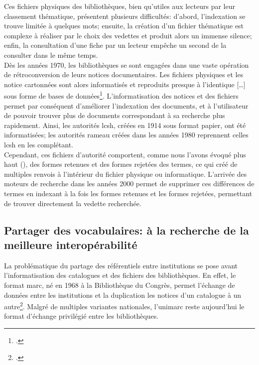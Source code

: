 Ces fichiers physiques des bibliothèques, bien qu'utiles aux lecteurs par leur classement thématique, présentent plusieurs difficultés: d'abord, l'indexation se trouve limitée à quelques mots; ensuite, la création d'un fichier thématique est complexe à réaliser par le choix des vedettes et produit alors un immense silence; enfin, la consultation d'une fiche par un lecteur empêche un second de la consulter dans le même temps.\\

Dès les années 1970, les bibliothèques se sont engagées dans une vaste opération de rétroconversion de leurs notices documentaires. Les fichiers physiques et les notice cartonnées sont alors informatisés et \og reproduits presque à l’identique [\dots] sous forme de bases de données\fg{}\footcite{bermes_1_2013}. L'informatisation des notices et des fichiers permet par conséquent d'améliorer l'indexation des documents, et à l'utilisateur de pouvoir trouver plus de documents correspondant à sa recherche plus rapidement. Ainsi, les autorités \ac{lcsh}, créées en 1914 sous format papier, ont été informatisées; les autorités \ac{rameau} créées dans les années 1980 reprennent celles \ac{lcsh} en les complétant.\\

Cependant, ces fichiers d'autorité comportent, comme nous l'avons évoqué plus haut (), des formes retenues et des formes rejetées des termes, ce qui créé de multiples renvois à l'intérieur du fichier physique ou informatique. L'arrivée des moteurs de recherche dans les années 2000 permet de supprimer ces différences de termes en indexant à la fois les formes retenues et les formes rejetées, permettant de trouver directement la vedette recherchée.

\subsection{\label{I-A-3-b}Partager des vocabulaires: à la recherche de la meilleure interopérabilité}

La problématique du partage des référentiels entre institutions se pose avant l'informatisation des catalogues et des fichiers des bibliothèques. En effet, le format \ac{marc}, né en 1968 à la Bibliothèque du Congrès, permet l'échange de données entre les institutions et la \og duplication les notices d’un catalogue à un autre\fg{}\footcite{bermes_2_2013}. Malgré de multiples variantes nationales, l'\ac{unimarc} reste aujourd'hui le format d'échange privilégié entre les bibliothèques.\\

